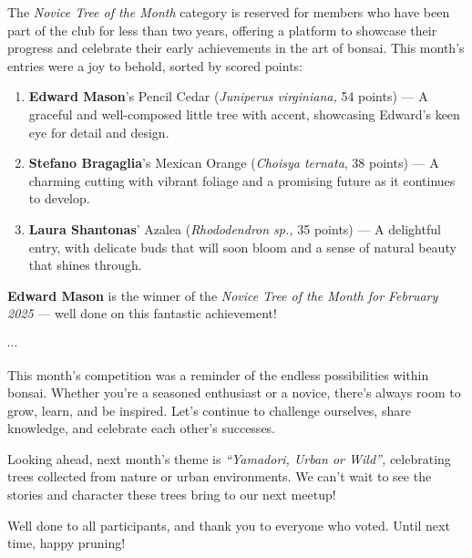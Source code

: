 \noindent 
The \textit{Novice Tree of the Month} category is reserved for members who have been part of the club for less than two years, offering a platform to showcase their progress and celebrate their early achievements in the art of bonsai.
This month's entries were a joy to behold, sorted by scored points:

\begin{enumerate}
    \item \textbf{Edward Mason}'s Pencil Cedar (\textit{Juniperus virginiana,} 54 points) --- A graceful and well-composed little tree with accent, showcasing Edward's keen eye for detail and design.
    
    \item \textbf{Stefano Bragaglia}'s Mexican Orange (\textit{Choisya ternata}, 38 points) --- A charming cutting with vibrant foliage and a promising future as it continues to develop.

    \item \textbf{Laura Shantonas}' Azalea (\textit{Rhododendron sp.,} 35 points) --- A delightful entry, with delicate buds that will soon bloom and a sense of natural beauty that shines through.
\end{enumerate}

\noindent 
\textbf{Edward Mason} is the winner of the \textit{Novice Tree of the Month for February 2025} --- well done on this fantastic achievement!

\begin{center}
    $\cdots$
\end{center}

\noindent
This month's competition was a reminder of the endless possibilities within bonsai. 
Whether you're a seasoned enthusiast or a novice, there's always room to grow, learn, and be inspired. 
Let's continue to challenge ourselves, share knowledge, and celebrate each other's successes.

Looking ahead, next month's theme is \textit{``Yamadori, Urban or Wild'',} celebrating trees collected from nature or urban environments.
We can't wait to see the stories and character these trees bring to our next meetup!

Well done to all participants, and thank you to everyone who voted.
Until next time, happy pruning!
\closearticle
